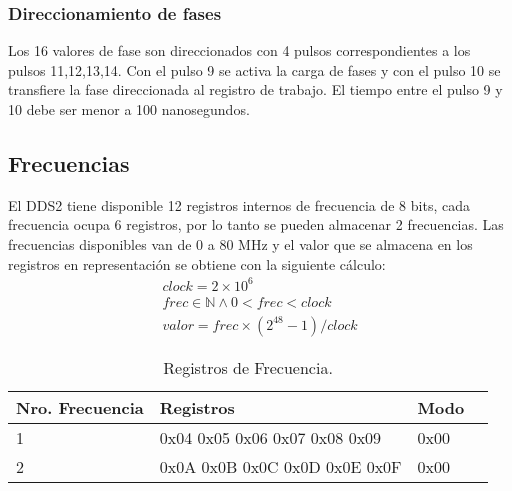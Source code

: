 \subsubsection{Direccionamiento de fases}
Los 16 valores de fase son direccionados con 4 pulsos correspondientes a los 
pulsos 11,12,13,14. Con el pulso 9 se activa la carga de fases y con el pulso 10
se transfiere la fase direccionada al registro de trabajo.
El tiempo entre el pulso 9 y 10 debe ser menor a 100 nanosegundos.

\subsection{Frecuencias}

El DDS2 tiene disponible 12 registros internos de frecuencia de 8 bits, cada frecuencia ocupa 6 registros, 
por lo tanto se pueden almacenar 2 frecuencias.
Las frecuencias disponibles van de 0 a 80 MHz y el valor que se almacena en los registros
en representaci\'on se obtiene con la siguiente c\'alculo:
\noindent
\begin{gather}
    clock = 2 \times 10^{6} \\
    \mathit{frec} \in \mathbb{N} \land 0 < frec < clock\\
    valor = frec \times (2^{48} -1 ) / clock
\end{gather}

\begin{table}[ht]
    \centering
    \begin{tabular}{|l|l|l|l|}
    \hline
    Nro. Frecuencia    & Registros       & Modo \\
    \hline
     1 & 0x04 0x05 0x06 0x07 0x08 0x09   & 0x00 \\
    \hline
     2 & 0x0A 0x0B 0x0C 0x0D 0x0E 0x0F   & 0x00 \\
    \hline
\end{tabular}
\caption{\label{tab:registros_frec}Registros de Frecuencia.}
\end{table}

